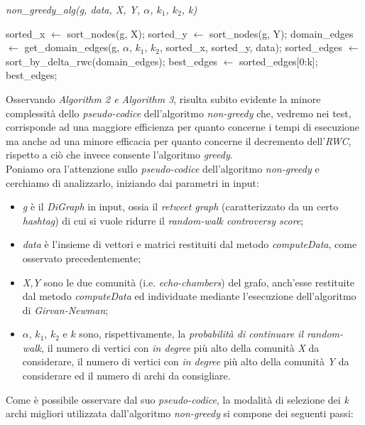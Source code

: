 \begin{algorithm}
\caption{\textit{non\_greedy\_alg(g, data, X, Y, $\alpha$, $k_1$, $k_2$, k)}}
\begin{algorithmic} 
\STATE sorted\_x $\leftarrow$ sort\_nodes(g, X); 
\STATE sorted\_y $\leftarrow$ sort\_nodes(g, Y);
\STATE domain\_edges $\leftarrow$ get\_domain\_edges(g, $\alpha$, $k_1$, $k_2$, sorted\_x, sorted\_y, data);
\STATE sorted\_edges $\leftarrow$ sort\_by\_delta\_rwc(domain\_edges);
\STATE best\_edges $\leftarrow$ sorted\_edges[0:k];
\RETURN best\_edges;
\end{algorithmic}
\end{algorithm}

Osservando \textit{Algorithm 2 e Algorithm 3}, risulta subito evidente la minore complessità dello \textit{pseudo-codice} dell'algoritmo \textit{non-greedy} che, vedremo nei test, corrisponde ad una maggiore efficienza per quanto concerne i tempi di esecuzione ma anche ad una minore efficacia per quanto concerne il decremento dell'\textit{RWC}, rispetto a ciò che invece consente l'algoritmo \textit{greedy}.
\\Poniamo ora l'attenzione sullo \textit{pseudo-codice} dell'algoritmo \textit{non-greedy} e cerchiamo di analizzarlo, iniziando dai parametri in input:
\begin{itemize}
\item \textit{g} è il \textit{DiGraph} in input, ossia il \textit{retweet graph} (caratterizzato da un certo \textit{hashtag}) di cui si vuole ridurre il \textit{random-walk controversy score}; 
\item \textit{data} è l'insieme di vettori e matrici restituiti dal metodo \textit{computeData}, come osservato precedentemente;
\item \textit{X,Y} sono le due comunità (i.e. \textit{echo-chambers}) del grafo, anch'esse restituite dal metodo \textit{computeData} ed individuate mediante l'esecuzione dell'algoritmo di \textit{Girvan-Newman};
\item $\alpha$, $k_1$, $k_2$ e $k$ sono, rispettivamente, la \textit{probabilità di continuare il random-walk}, il numero di vertici con \textit{in degree} più alto della comunità \textit{X} da considerare, il numero di vertici con \textit{in degree} più alto della comunità \textit{Y} da considerare ed il numero di archi da consigliare. 
\end{itemize}
Come è possibile osservare dal suo \textit{pseudo-codice}, la modalità di selezione dei \textit{k} archi migliori utilizzata dall'algoritmo \textit{non-greedy} si compone dei seguenti passi:
